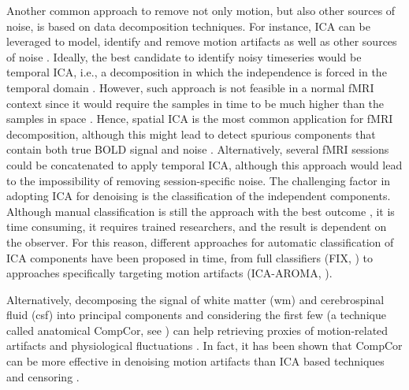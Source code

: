 Another common approach to remove not only motion, but also other sources of
noise, is based on data decomposition techniques. For instance, ICA can be
leveraged to model, identify and remove motion artifacts as well as other
sources of noise
\citep{Behzadi2007componentbasednoise,Griffanti2014ICAbasedartifact,Muschelli2014Reductionmotionrelated,Pruim2015ICAAROMArobust,Pruim2015EvaluationICAAROMA,SalimiKhorshidi2014Automaticdenoisingfunctional}.
Ideally, the best candidate to identify noisy timeseries would be temporal ICA,
i.e., a decomposition in which the independence is forced in the temporal domain
\citep{Glasser2018UsingtemporalICA,Smith2012Temporallyindependentfunctional}.
However, such approach is not feasible in a normal fMRI context since it would
require the samples in time to be much higher than the samples in space
\citep{Smith2012Temporallyindependentfunctional}. Hence, spatial ICA is the most
common application for fMRI decomposition, although this might lead to detect
spurious components that contain both true BOLD signal and noise
\citep{CaballeroGaudes2017MethodscleaningBOLD}. Alternatively, several fMRI
sessions could be concatenated to apply temporal ICA, although this approach
would lead to the impossibility of removing session-specific noise. The
challenging factor in adopting ICA for denoising is the classification of the
independent components. Although manual classification is still the approach
with the best outcome \citep{Griffanti2017HandclassificationfMRI}, it is time
consuming, it requires trained researchers, and the result is dependent on the
observer. For this reason, different approaches for automatic classification of
ICA components have been proposed in time, from full classifiers (FIX,
\cite{SalimiKhorshidi2014Automaticdenoisingfunctional}) to approaches
specifically targeting motion artifacts (ICA-AROMA,
\cite{Pruim2015ICAAROMArobust,Pruim2015EvaluationICAAROMA}).

Alternatively, decomposing the signal of white matter (\acrshort*{wm}) and
cerebrospinal fluid (\acrshort*{csf}) into principal components and considering
the first few (a technique called anatomical CompCor, see
\cite{Behzadi2007componentbasednoise}) can help retrieving proxies of
motion-related artifacts and physiological fluctuations
\citep{Behzadi2007componentbasednoise,Muschelli2014Reductionmotionrelated}. In
fact, it has been shown that CompCor can be more effective in denoising motion
artifacts than ICA based techniques and censoring
\citep{Mascali2021Evaluationdenoisingstrategies}.

